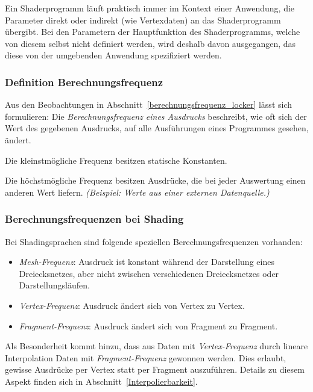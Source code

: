 Ein Shaderprogramm läuft praktisch immer im Kontext einer Anwendung, die Parameter direkt oder indirekt (wie
Vertexdaten) an das Shaderprogramm übergibt.
Bei den Parametern der Hauptfunktion des Shaderprogramms, welche von diesem selbst nicht definiert werden,
wird deshalb davon ausgegangen, das diese von der umgebenden Anwendung spezifiziert werden.

\subsubsection{Definition Berechnungsfrequenz}
\label{Berechnungsfrequenz}

Aus den Beobachtungen in Abschnitt~\ref{berechnungsfrequenz_locker} lässt sich formulieren:
Die \emph{Berechnungsfrequenz eines Ausdrucks} beschreibt, wie oft sich der Wert des gegebenen Ausdrucks, auf alle Ausführungen eines
Programmes gesehen, ändert.

Die kleinstmögliche Frequenz besitzen statische Konstanten.

Die höchstmögliche Frequenz besitzen Ausdrücke, die bei jeder Auswertung einen anderen Wert liefern.
\emph{(Beispiel: Werte aus einer externen Datenquelle.)}

\subsubsection{Berechnungsfrequenzen bei Shading}

Bei Shadingsprachen sind folgende speziellen Berechnungsfrequenzen vorhanden:
\begin{itemize}
\item \emph{Mesh-Frequenz}: Ausdruck ist konstant während der Darstellung eines Dreiecksnetzes, aber nicht zwischen
verschiedenen Dreiecksnetzes oder Darstellungsläufen. %
\item \emph{Vertex-Frequenz}: Ausdruck ändert sich von Vertex zu Vertex. %
\item \emph{Fragment-Frequenz}: Ausdruck ändert sich von Fragment zu Fragment. %
\end{itemize}

Als Besonderheit kommt hinzu, dass aus Daten mit \emph{Vertex-Frequenz} durch lineare Interpolation Daten mit
\emph{Fragment-Frequenz} gewonnen werden. %
Dies erlaubt, gewisse Ausdrücke per Vertex statt per Fragment auszuführen. Details zu diesem Aspekt finden sich in
Abschnitt~\ref{Interpolierbarkeit}.

